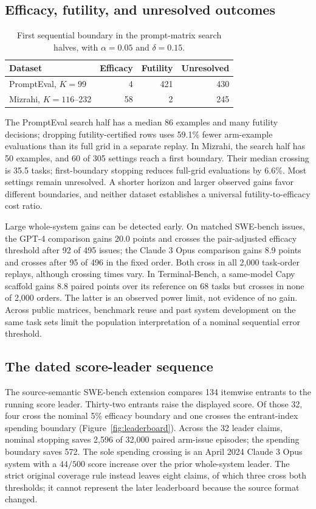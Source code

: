 \documentclass[11pt]{article}
\begin{document}
\subsection{Efficacy, futility, and unresolved outcomes}
\begin{table}[ht]
\centering
\caption{First sequential boundary in the prompt-matrix search halves, with $\alpha=0.05$ and $\delta=0.15$.}
\begin{tabular}{lrrr}
\toprule
Dataset & Efficacy & Futility & Unresolved\\
\midrule
PromptEval, $K=99$ & 4 & 421 & 430\\
Mizrahi, $K=116$--232 & 58 & 2 & 245\\
\bottomrule
\end{tabular}
\label{tab:decisions}
\end{table}

The PromptEval search half has a median 86 examples and many futility decisions; dropping futility-certified rows uses 59.1\% fewer arm-example evaluations than its full grid in a separate replay. In Mizrahi, the search half has 50 examples, and 60 of 305 settings reach a first boundary. Their median crossing is 35.5 tasks; first-boundary stopping reduces full-grid evaluations by 6.6\%. Most settings remain unresolved. A shorter horizon and larger observed gains favor different boundaries, and neither dataset establishes a universal futility-to-efficacy cost ratio.

Large whole-system gains can be detected early. On matched SWE-bench issues, the GPT-4 comparison gains 20.0 points and crosses the pair-adjusted efficacy threshold after 92 of 495 issues; the Claude 3 Opus comparison gains 8.9 points and crosses after 95 of 496 in the fixed order. Both cross in all 2,000 task-order replays, although crossing times vary. In Terminal-Bench, a same-model Capy scaffold gains 8.8 paired points over its reference on 68 tasks but crosses in none of 2,000 orders. The latter is an observed power limit, not evidence of no gain. Across public matrices, benchmark reuse and past system development on the same task sets limit the population interpretation of a nominal sequential error threshold.

\subsection{The dated score-leader sequence}
The source-semantic SWE-bench extension compares 134 itemwise entrants to the running score leader. Thirty-two entrants raise the displayed score. Of those 32, four cross the nominal 5\% efficacy boundary and one crosses the entrant-index spending boundary (Figure~\ref{fig:leaderboard}). Across the 32 leader claims, nominal stopping saves 2,596 of 32,000 paired arm-issue episodes; the spending boundary saves 572. The sole spending crossing is an April 2024 Claude 3 Opus system with a $44/500$ score increase over the prior whole-system leader. The strict original coverage rule instead leaves eight claims, of which three cross both thresholds; it cannot represent the later leaderboard because the source format changed.
\end{document}
